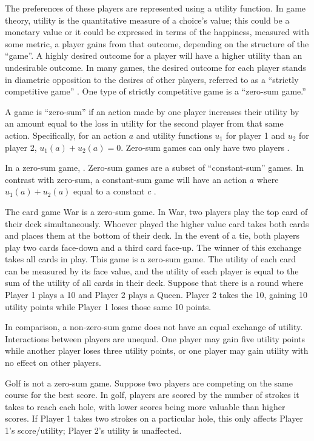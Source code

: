 The preferences of these players are represented using a utility function. In game theory, utility is the quantitative measure of a choice's value; this could be a monetary value or it could be expressed in terms of the happiness, measured with some metric, a player gains from that outcome, depending on the structure of the ``game''. A highly desired outcome for a player will have a higher utility than an undesirable outcome. In many games, the desired outcome for each player stands in diametric opposition to the desires of other players, referred to as a ``strictly competitive game'' \cite{osbo94}. One type of strictly competitive game is a ``zero-sum game.''
\begin{define}
  A game is ``zero-sum'' if an action made by one player increases their utility by an amount equal to the loss in utility for the second player from that same action. Specifically, for an action $a$ and utility functions $u_1$ for player 1 and $u_2$ for player 2, $u_1(a)+u_2(a)=0$. Zero-sum games can only have two players \cite{shoh09}.
\end{define}

In a zero-sum game, . Zero-sum games are a subset of ``constant-sum'' games. In contrast with zero-sum, a constant-sum game will have an action $a$ where $u_1(a)+u_2(a)$ equal to a constant $c$ \cite{shoh09}.

\begin{exmp}
  The card game War is a zero-sum game. In War, two players play the top card of their deck simultaneously. Whoever played the higher value card takes both cards and places them at the bottom of their deck. In the event of a tie, both players play two cards face-down and a third card face-up. The winner of this exchange takes all cards in play. This game is a zero-sum game. The utility of each card can be measured by its face value, and the utility of each player is equal to the sum of the utility of all cards in their deck. Suppose that there is a round where Player 1 plays a 10 and Player 2 plays a Queen. Player 2 takes the 10, gaining 10 utility points while Player 1 loses those same 10 points.
\end{exmp}

In comparison, a non-zero-sum game does not have an equal exchange of utility. Interactions between players are unequal. One player may gain five utility points while another player loses three utility points, or one player may gain utility with no effect on other players.

\begin{exmp}
  Golf is not a zero-sum game. Suppose two players are competing on the same course for the best score. In golf, players are scored by the number of strokes it takes to reach each hole, with lower scores being more valuable than higher scores. If Player 1 takes two strokes on a particular hole, this only affects Player 1's score/utility; Player 2's utility is unaffected.
\end{exmp}

